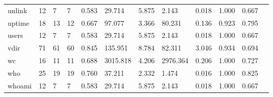 \begin{longtable}{lp{1.00cm}p{1.00cm}p{1.00cm}p{1.00cm}p{1.00cm}p{1.00cm}p{1.00cm}p{1.00cm}p{1.00cm}p{1.00cm}p{1.00cm}}
unlink    &                           12 &                  7 &                                 7 &                                      0.583 &                                 29.714 &                                        5.875 &                             2.143 &                                   0.018 &                        1.000 &                                        0.667 \\
uptime    &                           18 &                 13 &                                12 &                                      0.667 &                                 97.077 &                                        3.366 &                            80.231 &                                   0.136 &                        0.923 &                                        0.795 \\
users     &                           12 &                  7 &                                 7 &                                      0.583 &                                 29.714 &                                        5.875 &                             2.143 &                                   0.018 &                        1.000 &                                        0.667 \\
vdir      &                           71 &                 61 &                                60 &                                      0.845 &                                135.951 &                                        8.784 &                            82.311 &                                   3.046 &                        0.934 &                                        0.694 \\
wc        &                           16 &                 11 &                                11 &                                      0.688 &                               3015.818 &                                        4.206 &                          2976.364 &                                   0.206 &                        1.000 &                                        0.727 \\
who       &                           25 &                 19 &                                19 &                                      0.760 &                                 37.211 &                                        2.332 &                             1.474 &                                   0.016 &                        1.000 &                                        0.825 \\
whoami    &                           12 &                  7 &                                 7 &                                      0.583 &                                 29.714 &                                        5.875 &                             2.143 &                                   0.018 &                        1.000 &                                        0.667 \\

\end{longtable}
